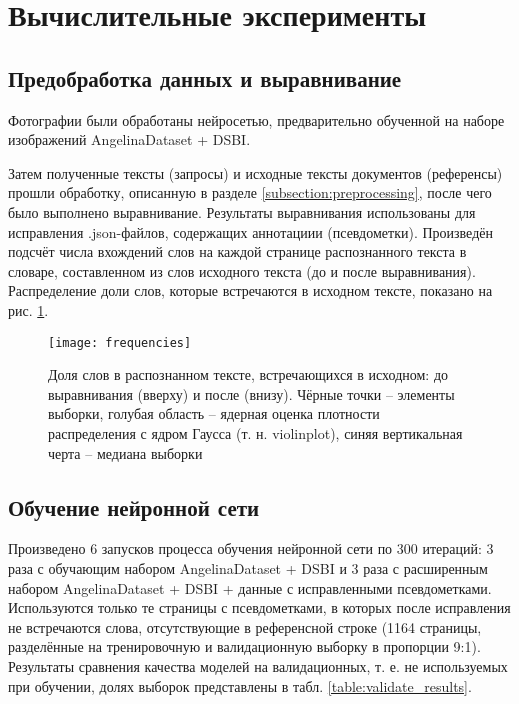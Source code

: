\documentclass{main.tex}[subfiles]
\begin{document}
\section{Вычислительные эксперименты}
\subsection{Предобработка данных и выравнивание}

Фотографии были обработаны нейросетью, предварительно обученной на наборе изображений AngelinaDataset + DSBI.

Затем полученные тексты (запросы) и исходные тексты документов (референсы) прошли обработку, описанную в разделе \ref{subsection:preprocessing}, после чего было выполнено выравнивание.
Результаты выравнивания использованы для исправления .json-файлов, содержащих аннотациии (псевдометки).
Произведён подсчёт числа вхождений слов на каждой странице распознанного текста в словаре, составленном из слов исходного текста (до и после выравнивания).
Распределение доли слов, которые встречаются в исходном тексте, показано на рис. \ref{fig:frequencies}.

\begin{figure}[H]
    \centering
    \texttt{[image: frequencies]}
    \caption{Доля слов в распознанном тексте, встречающихся в исходном: до выравнивания (вверху) и после (внизу). Чёрные точки -- элементы выборки, голубая область -- ядерная оценка плотности распределения с ядром Гаусса (т. н. violinplot), синяя вертикальная черта -- медиана выборки}
    \label{fig:frequencies}
\end{figure}

\subsection{Обучение нейронной сети}

Произведено 6 запусков процесса обучения нейронной сети по 300 итераций: 3 раза с обучающим набором AngelinaDataset + DSBI и 3 раза с расширенным набором AngelinaDataset + DSBI + данные с исправленными псевдометками.
Используются только те страницы с псевдометками, в которых после исправления не встречаются слова, отсутствующие в референсной строке (1164 страницы, разделённые на тренировочную и валидационную выборку в пропорции 9:1).
Результаты сравнения качества моделей на валидационных, т. е. не используемых при обучении, долях выборок представлены в табл. \ref{table:validate_results}.
\end{document}
